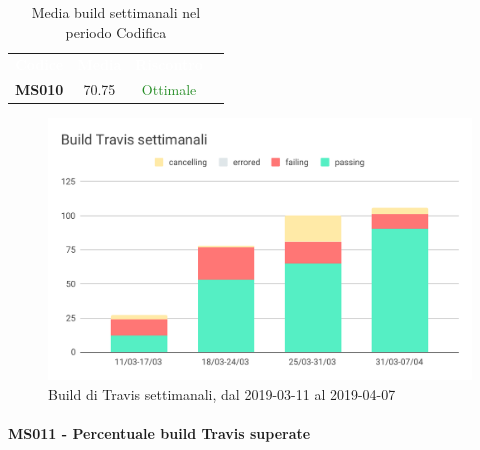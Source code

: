     \begin{table}[H]
        \centering
        \begin{tabular}{cccc}
        \rowcolor{greySWEight}
        \textcolor{white}{\textbf{Codice}} &
        \textcolor{white}{\textbf{Media}} &
        \textcolor{white}{\textbf{Riscontro}}\\
        \textbf{MS010}& 70.75 & \textcolor{ForestGreen}{Ottimale} \\
    
        \end{tabular}
        \caption{Media build settimanali nel periodo Codifica}
    \end{table}
    \begin{figure}[H]
        \centering
        \includegraphics[width=0.7\linewidth]{sez/App_Esito/Qualifica/graph/buildTravisSettimanale.pdf}
        \caption{Build di Travis settimanali, dal 2019-03-11 al 2019-04-07}
    \end{figure}

    \paragraph{MS011 - Percentuale build Travis superate }\mbox{}\\[0,3cm]
    
